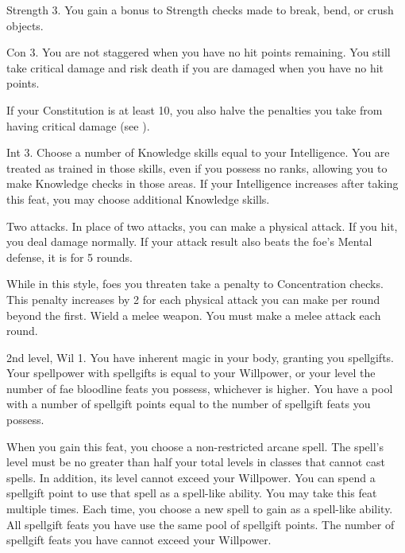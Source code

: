 \featpre Strength 3.
\featben You gain a  bonus to Strength checks made to break, bend, or crush objects.

\featpre Con 3.
\featben You are not staggered when you have no hit points remaining.
You still take critical damage and risk death if you are damaged when you have no hit points.

If your Constitution is at least 10, you also halve the penalties you take from having critical damage (see ).

\featpre Int 3.
\featben Choose a number of Knowledge skills equal to your Intelligence.
You are treated as trained in those skills, even if you possess no ranks, allowing you to make Knowledge checks in those areas.
If your Intelligence increases after taking this feat, you may choose additional Knowledge skills.

\featpre Two attacks.
\featben In place of two attacks, you can make a physical attack.
If you hit, you deal damage normally.
If your attack result also beats the foe's Mental defense, it is \disoriented for 5 rounds.

\featben While in this style, foes you threaten take a  penalty to Concentration checks.
This penalty increases by 2 for each physical attack you can make per round beyond the first.
\stylereq Wield a melee weapon. You must make a melee attack each round.

\featpres 2nd level, Wil 1.
\featben You have inherent magic in your body, granting you spellgifts.
Your spellpower with spellgifts is equal to your Willpower, or your level \add the number of fae bloodline feats you possess, whichever is higher.
You have a pool with a number of spellgift points equal to the number of spellgift feats you possess.

When you gain this feat, you choose a non-restricted arcane spell.
The spell's level must be no greater than half your total levels in classes that cannot cast spells.
In addition, its level cannot exceed your Willpower.
You can spend a spellgift point to use that spell as a spell-like ability.
You may take this feat multiple times.
Each time, you choose a new spell to gain as a spell-like ability.
All spellgift feats you have use the same pool of spellgift points.
The number of spellgift feats you have cannot exceed your Willpower.


